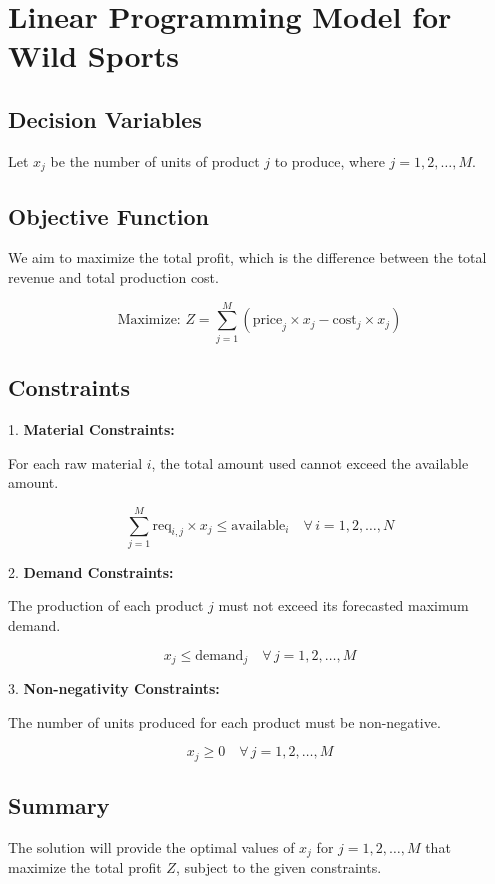\documentclass{article}
\begin{document}
\section*{Linear Programming Model for Wild Sports}

\subsection*{Decision Variables}
Let \( x_j \) be the number of units of product \( j \) to produce, where \( j = 1, 2, \ldots, M \).

\subsection*{Objective Function}
We aim to maximize the total profit, which is the difference between the total revenue and total production cost.

\[
\text{Maximize: } Z = \sum_{j=1}^{M} ( \text{price}_j \times x_j - \text{cost}_j \times x_j )
\]

\subsection*{Constraints}

1. \textbf{Material Constraints:}

For each raw material \( i \), the total amount used cannot exceed the available amount.

\[
\sum_{j=1}^{M} \text{req}_{i,j} \times x_j \leq \text{available}_i \quad \forall \, i = 1, 2, \ldots, N
\]

2. \textbf{Demand Constraints:}

The production of each product \( j \) must not exceed its forecasted maximum demand.

\[
x_j \leq \text{demand}_j \quad \forall \, j = 1, 2, \ldots, M
\]

3. \textbf{Non-negativity Constraints:}

The number of units produced for each product must be non-negative.

\[
x_j \geq 0 \quad \forall \, j = 1, 2, \ldots, M
\]

\subsection*{Summary}
The solution will provide the optimal values of \( x_j \) for \( j = 1, 2, \ldots, M \) that maximize the total profit \( Z \), subject to the given constraints.
\end{document}
